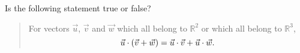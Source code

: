 \documentclass{ximera}
\author{Gregory Hartman \and Matthew Carr}
\begin{document}
\begin{exercise}



Is the following statement true or false?

\begin{quote}
For vectors $\vec{u}$, $\vec{v}$ and $\vec{w}$ which all belong to  $\mathbb{R}^2$ or which all belong to $\mathbb{R}^3$, 
\[
\vec{u}\cdot(\vec{v}+\vec{w})=\vec{u}\cdot\vec{v}+\vec{u}\cdot\vec{w}\ldotp
\]
\end{quote}

\begin{multipleChoice}
\end{multipleChoice}

\end{exercise}
\end{document}
